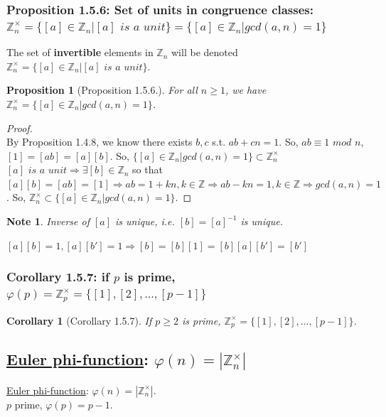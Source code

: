 \documentclass[11pt,a4paper]{article}
\newtheorem{proposition}{Proposition}
\newtheorem{corollary}{Corollary}
\newtheorem{note}{Note}
\begin{document}
\subsubsection{Proposition 1.5.6: Set of units in congruence classes: $\mathbb{Z}_n^{\times}=\{[a]\in\mathbb{Z}_n|[a] \textit{ is a unit}\}=\{[a]\in\mathbb{Z}_n|gcd(a,n)=1\}$}
The set of \textbf{invertible} elements in $\mathbb{Z}_n$ will be denoted $\mathbb{Z}_n^{\times}=\{[a]\in\mathbb{Z}_n|[a] \textit{ is a unit}\}$.
\begin{proposition}[Proposition 1.5.6.]
For all $n\geq 1$, we have $\mathbb{Z}_n^{\times}=\{[a]\in\mathbb{Z}_n|gcd(a,n)=1\}$.
\end{proposition}
\begin{proof}
    \quad\\
    By Proposition 1.4.8, we know there exists $b,c$ s.t. $ab+cn=1$. So, $ab \equiv 1 \textit{ mod }n$, $[1]=[ab]=[a][b]$. So, $\{[a]\in\mathbb{Z}_n|gcd(a,n)=1\}\subset \mathbb{Z}_n^{\times}$\\
    $[a] \textit{ is a unit}\Rightarrow $$\exists [b] \in \mathbb{Z}_n$ so that $[a][b] =[ab]= [1]\Rightarrow ab=1+kn, k\in \mathbb{Z}\Rightarrow ab-kn=1, k\in \mathbb{Z} \Rightarrow gcd(a,n)=1$. So, $\mathbb{Z}_n^{\times}\subset \{[a]\in\mathbb{Z}_n|gcd(a,n)=1\}$.
\end{proof}
\begin{note}
Inverse of $[a]$ is unique, i.e. $[b]=[a]^{-1}$ is unique.
\end{note}
$[a][b]=1, [a][b']=1\Rightarrow [b]=[b][1]=[b][a][b']=[b']$

\subsubsection{Corollary 1.5.7: if $p$ is prime, $\varphi(p)=\mathbb{Z}_p^{\times}=\{[1],[2],...,[p-1] \}$}
\begin{corollary}[Corollary 1.5.7]
If $p\geq2$ is prime, $\mathbb{Z}_p^{\times}=\{[1],[2],...,[p-1] \}$.
\end{corollary}
\subsection{\underline{Euler phi-function}: $\varphi(n)=|\mathbb{Z}_n^{\times}|$}
\underline{Euler phi-function}: $\varphi(n)=|\mathbb{Z}_n^{\times}|$.\\
$p$ prime, $\varphi(p)=p-1$.\\
\end{document}
